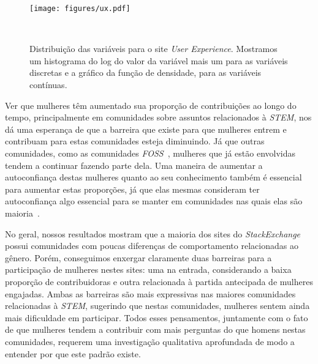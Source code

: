 \begin{figure}
  \centering
  \texttt{[image: figures/ux.pdf]}
  \caption[Distribuição das variáveis para o site \emph{User Experience}]{Distribuição das variáveis para o site \emph{User Experience}. Mostramos um histograma do log do valor da variável mais um para as variáveis discretas e a gráfico da função de densidade, para as variáveis contínuas.}~\label{fig:ux}
\end{figure}

Ver que mulheres têm aumentado sua proporção de contribuições ao longo do tempo, principalmente em comunidades sobre assuntos relacionados à \emph{STEM}, nos dá uma esperança de que a barreira que existe para que mulheres entrem e contribuam para estas comunidades esteja diminuindo. Já que outras comunidades, como as comunidades \emph{FOSS}~\cite{powell2010gender}, mulheres que já estão envolvidas tendem a continuar fazendo parte dela. Uma maneira de aumentar a autoconfiança destas mulheres quanto ao seu conhecimento também é essencial para aumentar estas proporções, já que elas mesmas consideram ter autoconfiança algo essencial para se manter em comunidades nas quais elas são maioria~\cite{powell2010gender}.

No geral, nossos resultados mostram que a maioria dos sites do \emph{StackExchange} possui comunidades com poucas diferenças de comportamento relacionadas ao gênero. Porém, conseguimos enxergar claramente duas barreiras para a participação de mulheres nestes sites: uma na entrada, considerando a baixa proporção de contribuidoras e outra relacionada à partida antecipada de mulheres engajadas. Ambas as barreiras são mais expressivas nas maiores comunidades relacionadas à \emph{STEM}, sugerindo que nestas comunidades, mulheres sentem ainda mais dificuldade em participar. Todos esses pensamentos, juntamente com o fato de que mulheres tendem a contribuir com mais perguntas do que homens nestas comunidades, requerem uma investigação qualitativa aprofundada de modo a entender por que este padrão existe.



